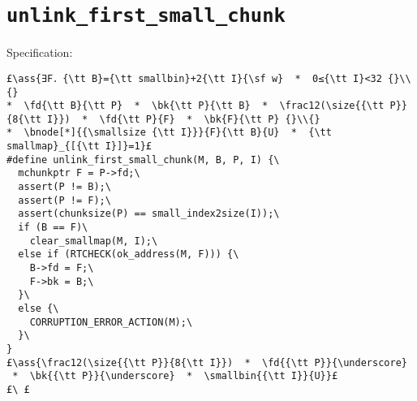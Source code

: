 \documentclass[svgnames,10pt,twoside]{report}
\makeatletter
\newcommand{\ml}[2][t]{\mbox{\mdseries\begin{tabular}[#1]{@{}L@{}}#2\end{tabular}}}
\newcommand{\ass}[1]{\ensuremath{{\color{blue}\left\{\ml[c]{#1}\right\}}}}
\makeatother
\begin{document}
\newpage
\section{{\tt unlink\_first\_small\_chunk}}

Specification:
\begin{lstlisting}
£\ass{∃F．{\tt B}={\tt smallbin}+2{\tt I}{\sf w}  *  0≤{\tt I}<32 {}\\{}
*  \fd{\tt B}{\tt P}  *  \bk{\tt P}{\tt B}  *  \frac12(\size{{\tt P}}{8{\tt I}})  *  \fd{\tt P}{F}  *  \bk{F}{\tt P} {}\\{}
*  \bnode[*]{{\smallsize {\tt I}}}{F}{\tt B}{U}  *  {\tt smallmap}_{[{\tt I}]}=1}£
#define unlink_first_small_chunk(M, B, P, I) {\
  mchunkptr F = P->fd;\
  assert(P != B);\
  assert(P != F);\
  assert(chunksize(P) == small_index2size(I));\
  if (B == F)\
    clear_smallmap(M, I);\
  else if (RTCHECK(ok_address(M, F))) {\
    B->fd = F;\
    F->bk = B;\
  }\
  else {\
    CORRUPTION_ERROR_ACTION(M);\
  }\
}
£\ass{\frac12(\size{{\tt P}}{8{\tt I}})  *  \fd{{\tt P}}{\underscore}  *  \bk{{\tt P}}{\underscore}  *  \smallbin{{\tt I}}{U}}£
£\ £
\end{lstlisting}
\end{document}
